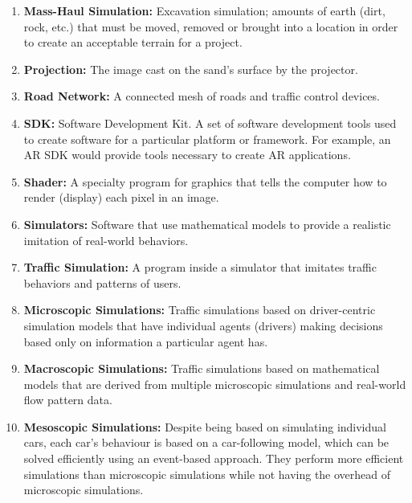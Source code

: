 \documentclass[letterpaper, 10pt, onecolumn, draftclsnofoot]{IEEEtran}
\begin{document}
\begin{enumerate}[label=]
        \item \textbf{Mass-Haul Simulation:} Excavation simulation; amounts of earth (dirt, rock, etc.) that must be moved, removed or brought into a location in order to create an acceptable terrain for a project.
        
        \item {\textbf{Projection:} The image cast on the sand's surface by the projector.}
        
        \item \textbf{Road Network:} A connected mesh of roads and traffic control devices.  
        
        \item {\textbf{SDK:} Software Development Kit. A set of software development tools used to create software for a particular platform or framework. For example, an AR SDK would provide tools necessary to create AR applications.}
        
        \item{\textbf{Shader:} A specialty program for graphics that tells the computer how to render (display) each pixel in an image.}
        
        \item \textbf{Simulators:} Software that use mathematical models to provide a realistic imitation of real-world behaviors.
        
        \item \textbf{Traffic Simulation:} A program inside a simulator that imitates traffic behaviors and patterns of users.
        
        \item \textbf{Microscopic Simulations:} Traffic simulations based on driver-centric simulation models that have individual agents (drivers) making decisions based only on information a particular agent has.
        
         \item \textbf{Macroscopic Simulations:} Traffic simulations based on mathematical models that are derived from multiple microscopic simulations and real-world flow pattern data.
    
        \item \textbf{Mesoscopic Simulations:} Despite being based on simulating individual cars, each car's behaviour is based on a car-following model, which can be solved efficiently using an event-based approach. They perform more efficient simulations than microscopic simulations while not having the overhead of microscopic simulations.
        

\end{enumerate}
\end{document}
